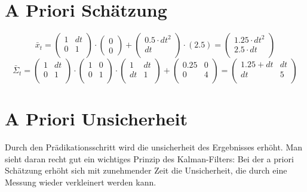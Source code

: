 \documentclass[12pt,a4paper]{article}
\begin{document}
\section{A Priori Schätzung}
\[\bar{x}_t = \begin{pmatrix}
1 & dt \\
0 & 1 \\
\end{pmatrix} \cdot \begin{pmatrix}
0 \\ 0 \end{pmatrix} + \begin{pmatrix}
0.5 \cdot dt^2 \\ dt \\ \end{pmatrix} \cdot (2.5) =
\begin{pmatrix}
1.25 \cdot dt^2 \\
2.5 \cdot dt \\
\end{pmatrix}
\]
\[
\bar{\Sigma}_t = \begin{pmatrix}
1 & dt \\
0 & 1 \\
\end{pmatrix} \cdot \begin{pmatrix}
1 & 0 \\
0 & 1 \\
\end{pmatrix} \cdot \begin{pmatrix}
1 & dt \\
dt & 1 \\
\end{pmatrix} + \begin{pmatrix}
0.25 & 0 \\
0 & 4 \\
\end{pmatrix}  =
\begin{pmatrix}
1.25 + dt & dt \\
dt & 5 \\
\end{pmatrix}
\]

\section{A Priori Unsicherheit}
Durch den Prädikationsschritt wird die unsicherheit des Ergebnisses erhöht. Man sieht daran recht gut ein wichtiges Prinzip des Kalman-Filters: Bei der a priori Schätzung erhöht sich mit zunehmender Zeit die Unsicherheit, die durch eine Messung wieder verkleinert werden kann.
\end{document}
